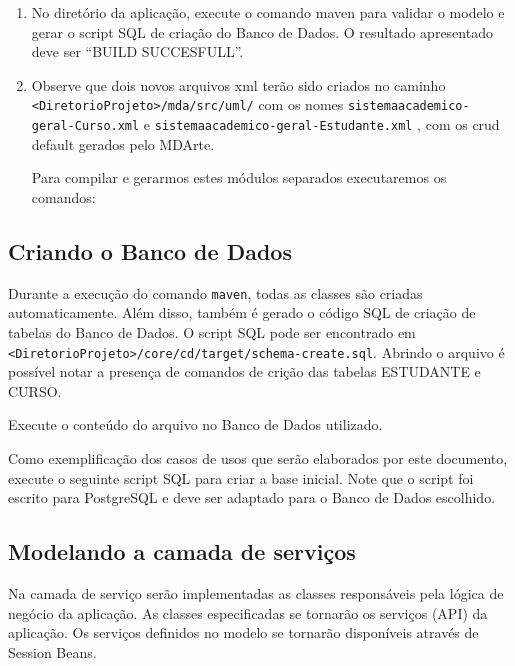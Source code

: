 \begin{enumerate}
\item No diretório da aplicação, execute o comando maven para validar o modelo e
gerar o script SQL de criação do Banco de Dados. O resultado apresentado deve
ser “BUILD SUCCESFULL”.
	
\item Observe que dois novos arquivos xml terão sido criados no caminho
\texttt{<DiretorioProjeto>/mda/src/uml/} com os nomes
\texttt{sistemaacademico-geral-Curso.xml} e
\texttt{sistemaacademico-geral-Estudante.xml} , com os crud default gerados pelo
MDArte.

Para compilar e gerarmos estes módulos separados executaremos os comandos:
	
\begin{framed}
	
\end{framed}

\end{enumerate}

\subsection{Criando o Banco de Dados}

Durante a execução do comando \texttt{maven}, todas as classes são criadas
automaticamente. Além disso, também é gerado o código SQL de criação de tabelas
do Banco de Dados. O script SQL pode ser encontrado em
\texttt{<DiretorioProjeto>/core/cd/target/schema-create.sql}. Abrindo o arquivo
é possível notar a presença de comandos de crição das tabelas ESTUDANTE e CURSO.

Execute o conteúdo do arquivo no Banco de Dados utilizado.

Como exemplificação dos casos de usos que serão elaborados por este documento,
execute o seguinte script SQL para criar a base inicial. Note que o script foi
escrito para PostgreSQL e deve ser adaptado para o Banco de Dados escolhido.

\begin{framed}
	
\end{framed}

\subsection{Modelando a camada de serviços}

Na camada de serviço serão implementadas as classes responsáveis pela lógica de
negócio da aplicação. As classes especificadas se tornarão os serviços (API) da
aplicação. Os serviços definidos no modelo se tornarão disponíveis através de
Session Beans.

